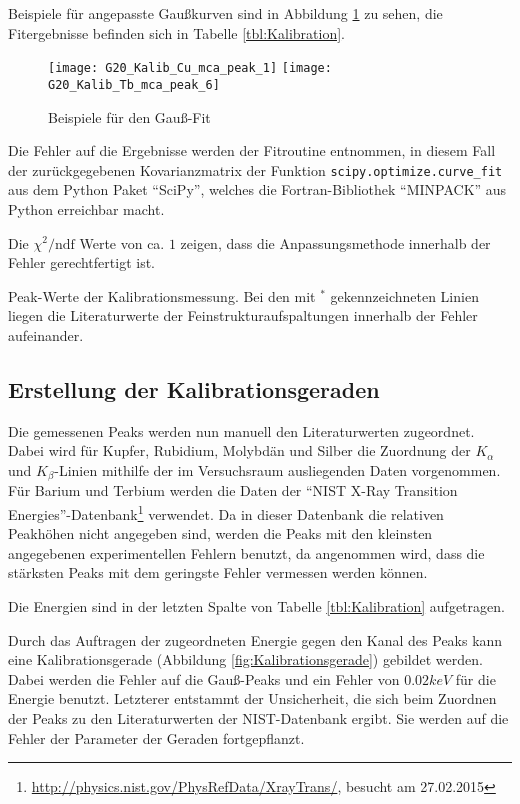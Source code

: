 \documentclass{../Misc/MontavonLaTeX/Montavon}
\newcommand{\halfwidth}{0.48\textwidth}
\begin{document}
Beispiele für angepasste Gaußkurven sind in Abbildung \ref{fig:GaussFit} zu sehen, die Fitergebnisse befinden sich in Tabelle \ref{tbl:Kalibration}.

\begin{figure}[h]
\texttt{[image: G20\_Kalib\_Cu\_mca\_peak\_1]}
\texttt{[image: G20\_Kalib\_Tb\_mca\_peak\_6]}
\caption{Beispiele für den Gauß-Fit}
\label{fig:GaussFit}
\end{figure}

Die Fehler auf die Ergebnisse werden der Fitroutine entnommen, in diesem Fall der zurückgegebenen Kovarianzmatrix der Funktion \texttt{scipy.optimize.curve\_fit} aus dem Python Paket \enquote{SciPy}, welches die Fortran-Bibliothek \enquote{MINPACK} aus Python erreichbar macht.

Die $\chi^2/\textrm{ndf}$ Werte von ca. $1$ zeigen, dass die Anpassungsmethode innerhalb der Fehler gerechtfertigt ist.

\begin{table}[H]
\centering
\small
\makebox[\textwidth][c]{}
\caption{Peak-Werte der Kalibrationsmessung. Bei den mit $^*$ gekennzeichneten Linien liegen die Literaturwerte der Feinstrukturaufspaltungen innerhalb der Fehler aufeinander.}
\label{tbl:Kalibration}
\end{table}


\subsection{Erstellung der Kalibrationsgeraden}
Die gemessenen Peaks werden nun manuell den Literaturwerten zugeordnet. Dabei wird für Kupfer, Rubidium, Molybdän und Silber die Zuordnung der $K_\alpha$ und $K_\beta$-Linien mithilfe der im Versuchsraum ausliegenden Daten vorgenommen. Für Barium und Terbium werden die Daten der \enquote{NIST X-Ray Transition Energies}-Datenbank\footnote{\url{http://physics.nist.gov/PhysRefData/XrayTrans/}, besucht am 27.02.2015} verwendet. Da in dieser Datenbank die relativen Peakhöhen nicht angegeben sind, werden die Peaks mit den kleinsten angegebenen experimentellen Fehlern benutzt, da angenommen wird, dass die stärksten Peaks mit dem geringste Fehler vermessen werden können.

Die Energien sind in der letzten Spalte von Tabelle \ref{tbl:Kalibration} aufgetragen.

Durch das Auftragen der zugeordneten Energie gegen den Kanal des Peaks kann eine Kalibrationsgerade (Abbildung \ref{fig:Kalibrationsgerade}) gebildet werden. Dabei werden die Fehler auf die Gauß-Peaks und ein Fehler von $0.02 \unit{keV}$ für die Energie benutzt. Letzterer entstammt der Unsicherheit, die sich beim Zuordnen der Peaks zu den Literaturwerten der NIST-Datenbank ergibt. 
Sie werden auf die Fehler der Parameter der Geraden fortgepflanzt.
\end{document}
